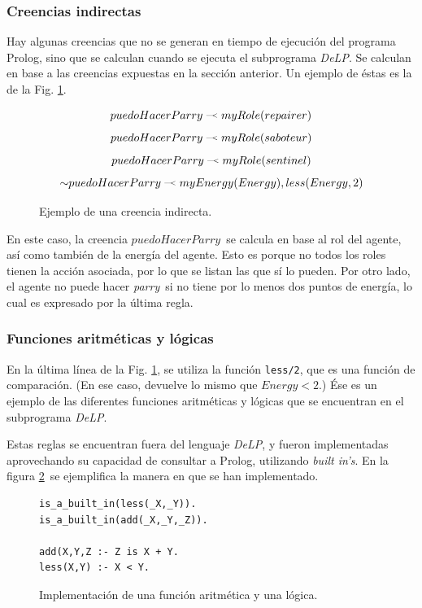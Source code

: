 \documentclass[oneside]{book}
\theoremstyle{definition}
\theoremstyle{example}
\newcommand{\DLP}{\mbox{\textit{DeLP}}}
\newcommand{\no}{\mbox{$\sim$}}
\newcommand{\lit}[1]{\mbox{$ #1$}}
\newcommand{\drule}[2]{\mbox{$ #1\; \defleftarrow \; #2$}}
\newcommand{\defleftarrow}{{\raise1.5pt\hbox{\tiny\defleft}}}
\newcommand{\defleft}{\mbox{---\hspace{-1.5pt}\raise.05pt\hbox{$<$}}}
\newcommand{\nlA}[1]{$$\mbox{#1}$$}
\begin{document}
\subsubsection{Creencias indirectas}

\label{sec:creeciasIndirectas}

Hay algunas creencias que no se generan en tiempo de ejecución del programa Prolog, sino
que se calculan cuando se ejecuta el subprograma \DLP. Se calculan en base a las creencias
expuestas en la sección anterior. Un ejemplo de éstas es la de la Fig. 
\ref{fig:creenciaIndirecta}.

\begin{figure}

\nlA{\drule{puedoHacerParry}{myRole(repairer)}}
\nlA{\drule{puedoHacerParry}{myRole(saboteur)}}
\nlA{\drule{puedoHacerParry}{myRole(sentinel)}}
\nlA{\drule{\no puedoHacerParry}{myEnergy(Energy), less(Energy,2)}}


\caption{Ejemplo de una creencia indirecta.}
\label{fig:creenciaIndirecta}

\end{figure}

En este caso, la creencia \lit{puedoHacerParry}\ se calcula en base al rol del 
agente,
así como también de la energía del agente. Esto es porque no todos los roles tienen la
acción asociada, por lo que se listan las que sí lo pueden. Por otro lado, el agente
no puede hacer \textit{parry}\ si no tiene por lo menos dos puntos de energía, lo cual
es expresado por la última regla.

\subsubsection{Funciones aritméticas y lógicas}

En la última línea de la Fig. \ref{fig:creenciaIndirecta}, se utiliza la función 
\texttt{less/2}, que es una función de comparación. (En ese caso, devuelve lo mismo
que $Energy < 2$.) Ése es un ejemplo de las diferentes funciones aritméticas y 
lógicas que se encuentran en el subprograma \DLP.

Estas reglas se encuentran fuera del lenguaje \DLP, y fueron implementadas 
aprovechando su capacidad de consultar a Prolog, utilizando \textit{built in's}.
En la figura \ref{fig:funciones}\ se ejemplifica la manera en que se han 
implementado.

\begin{figure}
\begin{verbatim}    
is_a_built_in(less(_X,_Y)).
is_a_built_in(add(_X,_Y,_Z)).

add(X,Y,Z :- Z is X + Y.
less(X,Y) :- X < Y.
\end{verbatim}

\caption{Implementación de una función aritmética y una lógica.}
\label{fig:funciones}
\end{figure}
\end{document}
